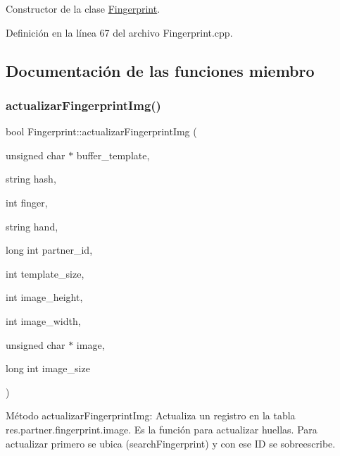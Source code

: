 Constructor de la clase \hyperlink{classFingerprint}{Fingerprint}. 



Definición en la línea 67 del archivo Fingerprint.\+cpp.



\subsection{Documentación de las funciones miembro}
\hypertarget{classFingerprint_a5194ba2b4266c2d030ac2a7d41778aad}{}\label{classFingerprint_a5194ba2b4266c2d030ac2a7d41778aad} 
\subsubsection{\texorpdfstring{actualizar\+Fingerprint\+Img()}{actualizarFingerprintImg()}}
{\footnotesize\ttfamily bool Fingerprint\+::actualizar\+Fingerprint\+Img (\begin{DoxyParamCaption}\item[{unsigned char $\ast$}]{buffer\+\_\+template,  }\item[{string}]{hash,  }\item[{int}]{finger,  }\item[{string}]{hand,  }\item[{long int}]{partner\+\_\+id,  }\item[{int}]{template\+\_\+size,  }\item[{int}]{image\+\_\+height,  }\item[{int}]{image\+\_\+width,  }\item[{unsigned char $\ast$}]{image,  }\item[{long int}]{image\+\_\+size }\end{DoxyParamCaption})\hspace{0.3cm}{\ttfamily [inline]}}



Método actualizar\+Fingerprint\+Img\+: Actualiza un registro en la tabla res.\+partner.\+fingerprint.\+image. Es la función para actualizar huellas. Para actualizar primero se ubica (search\+Fingerprint) y con ese ID se sobreescribe. 

